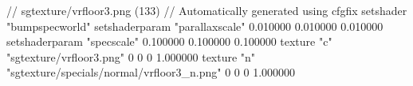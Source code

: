 // sgtexture/vrfloor3.png (133)
// Automatically generated using cfgfix
setshader "bumpspecworld"
setshaderparam "parallaxscale" 0.010000 0.010000 0.010000
setshaderparam "specscale" 0.100000 0.100000 0.100000
texture "c" "sgtexture/vrfloor3.png" 0 0 0 1.000000
texture "n" "sgtexture/specials/normal/vrfloor3_n.png" 0 0 0 1.000000
